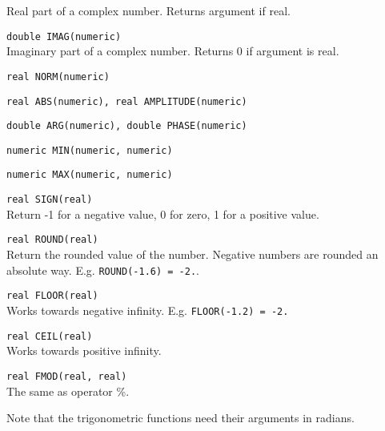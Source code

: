 \begin{description}
    Real part of a complex number. Returns argument if real.
  \item[] \texttt{double IMAG(numeric)}\\
    Imaginary part of a complex number. Returns 0 if argument is real.
  \item[] \texttt{real NORM(numeric)}
  \item[] \texttt{real ABS(numeric),  real AMPLITUDE(numeric)}
  \item[] \texttt{double ARG(numeric),  double PHASE(numeric)}
  \item[] \texttt{numeric MIN(numeric, numeric)}
  \item[] \texttt{numeric MAX(numeric, numeric)}
  \item[] \texttt{real SIGN(real)}\\
    Return -1 for a negative value, 0 for zero, 1 for a positive value.
  \item[] \texttt{real ROUND(real)}\\
    Return the rounded value of the number. Negative numbers are
    rounded an absolute way.
    E.g. \texttt{ROUND(-1.6) = -2.}.
  \item[] \texttt{real FLOOR(real)}\\
    Works towards negative infinity.
    E.g. \texttt{FLOOR(-1.2) = -2.}
  \item[] \texttt{real CEIL(real)}\\
    Works towards positive infinity.
  \item[] \texttt{real FMOD(real, real)}\\
    The same as operator \%.
\end{description}
Note that the trigonometric functions need their arguments in radians.

